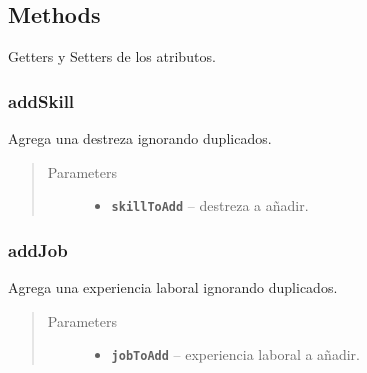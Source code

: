 \documentclass[letterpaper,10pt,english]{sphinxmanual}
\begin{document}
\subsection{Methods}
\label{Model/Contact:methods}
Getters y Setters de los atributos.


\subsubsection{addSkill}
\label{Model/Contact:addskill}

\begin{fulllineitems}
\label{Model/Contact:com.fiuba.tallerii.jobify.Contact.addSkill(Skill)}
Agrega una destreza ignorando duplicados.
\begin{quote}\begin{description}
\item[{Parameters}] \leavevmode\begin{itemize}
\item {} 
\textbf{\texttt{skillToAdd}} -- destreza a añadir.

\end{itemize}

\end{description}\end{quote}

\end{fulllineitems}



\subsubsection{addJob}
\label{Model/Contact:addjob}

\begin{fulllineitems}
\label{Model/Contact:com.fiuba.tallerii.jobify.Contact.addJob(Job)}
Agrega una experiencia laboral ignorando duplicados.
\begin{quote}\begin{description}
\item[{Parameters}] \leavevmode\begin{itemize}
\item {} 
\textbf{\texttt{jobToAdd}} -- experiencia laboral a añadir.

\end{itemize}

\end{description}\end{quote}

\end{fulllineitems}
\end{document}
